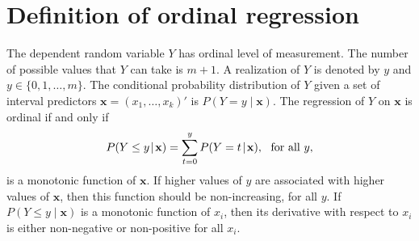 \documentclass[man,floatmark,12pt]{apa}
\begin{document}
\section{Definition of ordinal regression}

The dependent random variable $Y$ has ordinal level of measurement. The number of possible values that $Y$ can take is $m+1$. A realization of $Y$ is denoted by $y$ and $y\in\{0,1,\ldots,m\}$. The conditional probability distribution of $Y$ given a set of interval predictors $\mathbf{x}=(x_{1},\ldots,x_{k})'$ is $P(Y=y\!\mid\!\mathbf{x})$. The regression of $Y$ on $\mathbf{x}$ is ordinal if and only if
\begin{equation}
P(Y\leq y\!\mid\!\mathbf{x})=\sum_{t=0}^{y}P(Y=t\!\mid\!\mathbf{x}),\ \ \textup{for all $y$},
\end{equation}
is a monotonic function of $\mathbf{x}$. If higher values of $y$ are associated with higher values of $\mathbf{x}$, then this function should be non-increasing, for all $y$. If $P(Y\leq y\!\mid\!\mathbf{x})$ is a monotonic function of $x_{i}$, then its derivative with respect to $x_{i}$ is either non-negative or non-positive for all $x_{i}$.
\end{document}
